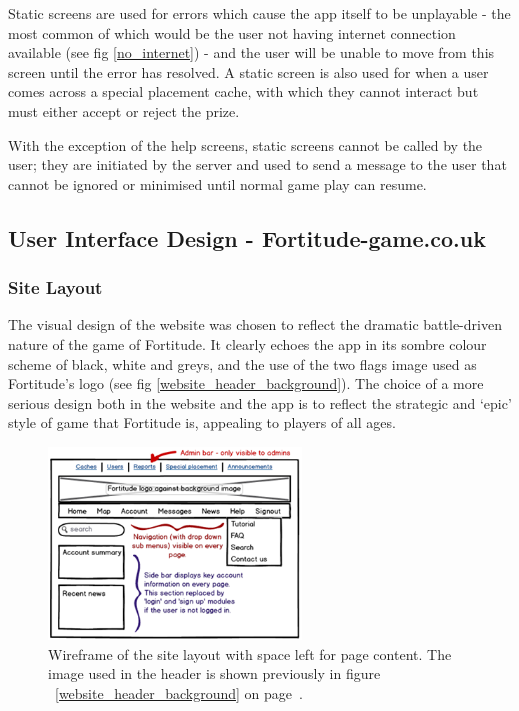 Static screens are used for errors which cause the app itself to be unplayable - the most common of which would be the user not having internet connection available (see fig \ref{no_internet}) - and the user will be unable to move from this screen until the error has resolved. A static screen is also used for when a user comes across a special placement cache, with which they cannot interact but must either accept or reject the prize.

With the exception of the help screens, static screens cannot be called by the user; they are initiated by the server and used to send a message to the user that cannot be ignored or minimised until normal game play can resume.

\subsection{User Interface Design - Fortitude-game.co.uk}

\subsubsection{Site Layout}

The visual design of the website was chosen to reflect the dramatic battle-driven nature of the game of Fortitude. It clearly echoes the app in its sombre colour scheme of black, white and greys, and the use of the two flags image used as Fortitude's logo (see fig \ref{website_header_background}). The choice of a more serious design both in the website and the app is to reflect the strategic and `epic' style of game that Fortitude is, appealing to players of all ages.

\begin{figure}
	\vspace{-30pt}
	\begin{center}
	\includegraphics[width=0.6\textwidth]{images/website_wireframe}
	\caption{Wireframe of the site layout with space left for page content. The image used in the header is shown previously in figure ~\ref{website_header_background} on page~\pageref{website_header_background}.}
	\label{website_wireframe}
	\end{center}
	\vspace{-20pt}
\end{figure}

